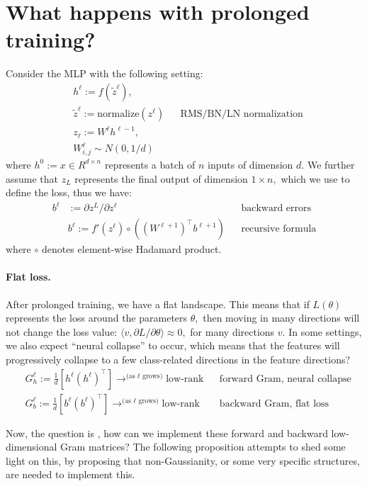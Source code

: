 \documentclass[11pt]{article}
\begin{document}
\section{What happens with prolonged training?}

Consider the MLP with the following setting: 
\begin{align*}
    &h^\ell := f(\tilde{z}^\ell ), \\
    &\tilde{z}^\ell := \text{normalize}(z^\ell)  && \text{RMS/BN/LN normalization} \\
    & z_\ell:= W^\ell h^{\ell-1}, \\
    & W^\ell_{i,j}\sim N(0,1/d)
\end{align*}
where $h^0:= x \in R^{d\times n}$ represents a batch of $n$ inputs of dimension $d.$ We further assume that $z_L$ represents the final output of dimension $1\times n,$ which we use to define the loss, thus we have:
\begin{align*}
    b^\ell &:= \partial z^L/\partial z^\ell && \text{backward errors}\\
    &b^\ell := f'(z^\ell) \circ ((W^{\ell+1})^\top b^{\ell+1}) && \text{recursive formula}
\end{align*}
where $\circ$ denotes element-wise Hadamard product. 


\paragraph{Flat loss. } After prolonged training, we have a flat landscape. This means that if $L(\theta)$ represents the loss around the parameters $\theta,$ then moving in many directions will not change the loss value: $\langle v, \partial L/\partial \theta\rangle \approx 0 ,$ for many directions $v. $  In some settings, we also expect ``neural collapse'' to occur, which means that the features will progressively collapse to a few class-related directions in the feature directions? 
\begin{align*}
    &G_h^\ell := \frac1d [h^\ell (h^\ell)^\top] \to^{\text{(as $\ell$ grows)}} \text{low-rank} && \text{forward Gram, neural collapse}\\
    &G_b^\ell := \frac1d [b^\ell (b^\ell)^\top ]\to^{\text{(as $\ell$ grows)}}\text{low-rank} && \text{backward Gram, flat loss }
\end{align*}

Now, the question is , how can we implement these forward and backward low-dimensional Gram matrices? The following proposition attempts to shed some light on this, by proposing that non-Gaussianity, or some very specific structures, are needed to implement this. 
\end{document}
